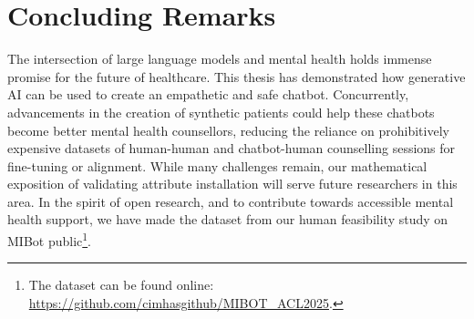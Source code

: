 \section{Concluding Remarks}

The intersection of large language models and mental health holds immense promise for the future of healthcare. This thesis has demonstrated how generative AI can be used to create an empathetic and safe chatbot. Concurrently, advancements in the creation of synthetic patients could help these chatbots become better mental health counsellors, reducing the reliance on prohibitively expensive datasets of human-human and chatbot-human counselling sessions for fine-tuning or alignment. While many challenges remain, our mathematical exposition of validating attribute installation will serve future researchers in this area. In the spirit of open research, and to contribute towards accessible mental health support, we have made the dataset from our human feasibility study on MIBot public\footnote{The dataset can be found online: \url{https://github.com/cimhasgithub/MIBOT\_ACL2025}.}.
